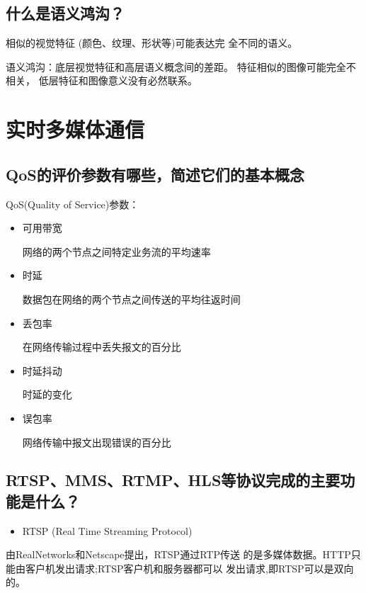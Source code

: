 \documentclass[UTF8,a4paper,AutoFakeBold,AutoFakeSlant]{ctexart}
\begin{document}
\subsection{什么是语义鸿沟？}

相似的视觉特征 (颜色、纹理、形状等)可能表达完
全不同的语义。

语义鸿沟：底层视觉特征和高层语义概念间的差距。
特征相似的图像可能完全不相关，
低层特征和图像意义没有必然联系。






\section{实时多媒体通信}


\subsection{QoS的评价参数有哪些，简述它们的基本概念}

QoS(Quality of Service)参数：
\begin{itemize}
	\item 可用带宽
	
	网络的两个节点之间特定业务流的平均速率
	\item 时延
	
	数据包在网络的两个节点之间传送的平均往返时间
	\item 丢包率
	
	在网络传输过程中丢失报文的百分比
	\item 时延抖动
	
	时延的变化
	\item 误包率
	
	网络传输中报文出现错误的百分比
\end{itemize}



\subsection{RTSP、MMS、RTMP、HLS等协议完成的主要功能是什么？}

\begin{itemize}
	\item RTSP (Real Time Streaming Protocol)
\end{itemize}

由RealNetworks和Netscape提出，RTSP通过RTP传送
的是多媒体数据。HTTP只能由客户机发出请求;RTSP客户机和服务器都可以
发出请求,即RTSP可以是双向的。
\end{document}
